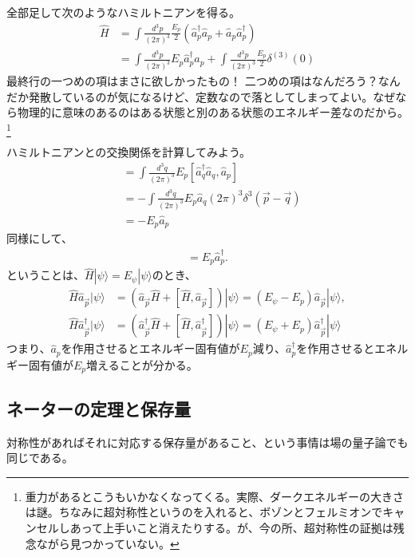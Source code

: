 \documentclass[10pt,a4paper]{jarticle}
\begin{document}
%
全部足して次のようなハミルトニアンを得る。
\begin{align}
\hat H
&= \int \frac{d^3 p}{(2\pi)^3} \frac{E_p}{2}( \hat a_p^\dagger \hat a_p + \hat a_p \hat a_p^\dagger ) \nonumber\\
&= \int \frac{d^3 p}{(2\pi)^3} E_p \hat a_p^\dagger \hat a_p + \int \frac{d^3 p}{(2\pi)^3} \frac{E_p}{2} \delta^{(3)}(0)
\end{align}
最終行の一つめの項はまさに欲しかったもの！
二つめの項はなんだろう？なんだか発散しているのが気になるけど、定数なので落としてしまってよい。なぜなら物理的に意味のあるのはある状態と別のある状態のエネルギー差なのだから。\footnote{
重力があるとこうもいかなくなってくる。実際、ダークエネルギーの大きさは謎。ちなみに超対称性というのを入れると、ボゾンとフェルミオンでキャンセルしあって上手いこと消えたりする。が、今の所、超対称性の証拠は残念ながら見つかっていない。}

ハミルトニアンとの交換関係を計算してみよう。
\begin{align}
[\hat H, \hat a_p]
&=\int \frac{d^3 q}{(2\pi)^3} E_p [\hat a_q^\dagger \hat a_q, \hat a_p] \nonumber\\
&=-\int \frac{d^3 q}{(2\pi)^3} E_p \hat a_q (2\pi)^3 \delta^3(\vec p - \vec q) \nonumber\\
&=-E_p \hat a_p
\end{align}
同様にして、
\begin{align}
[\hat H, \hat a_p^\dagger] = E_p \hat a_p^\dagger.
\end{align}
%
ということは、$\hat H |\psi \rangle = E_\psi |\psi\rangle$のとき、
\begin{align}
\hat H  \hat a_{\vec p} |\psi\rangle &= (\hat a_{\vec p} \hat H + [\hat H, \hat a_{\vec p}]) |\psi\rangle = (E_\psi - E_p)  \hat a_{\vec p} |\psi\rangle, \\
\hat H  \hat a_{\vec p}^\dagger |\psi\rangle &= (\hat a_{\vec p}^\dagger \hat H + [\hat H, \hat a_{\vec p}^\dagger]) |\psi\rangle = (E_\psi + E_p)  \hat a_{\vec p}^\dagger |\psi\rangle
\end{align}
つまり、$\hat a_p$を作用させるとエネルギー固有値が$E_p$減り、$\hat a_p^\dagger$を作用させるとエネルギー固有値が$E_p$増えることが分かる。

\subsection{ネーターの定理と保存量}
対称性があればそれに対応する保存量があること、という事情は場の量子論でも同じである。
\end{document}
